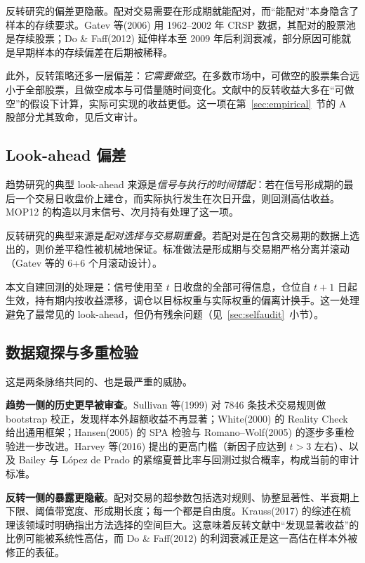反转研究的偏差更隐蔽。配对交易需要在形成期就能配对，而“能配对”本身隐含了样本的存续要求。Gatev 等(2006) 用 1962--2002 年 CRSP 数据，其配对的股票池是存续股票\cite{gatev2006}；Do \& Faff(2012) 延伸样本至 2009 年后利润衰减，部分原因可能就是早期样本的存续偏差在后期被稀释\cite{dofaff2012}。

此外，反转策略还多一层偏差：\emph{它需要做空}。在多数市场中，可做空的股票集合远小于全部股票，且做空成本与可借量随时间变化。文献中的反转收益大多在“可做空”的假设下计算，实际可实现的收益更低。这一项在第~\ref{sec:empirical}~节的 A 股部分尤其致命，见后文审计。

\subsection{Look-ahead 偏差}

趋势研究的典型 look-ahead 来源是\emph{信号与执行的时间错配}：若在信号形成期的最后一个交易日收盘价上建仓，而实际执行发生在次日开盘，则回测高估收益。MOP12 的构造以月末信号、次月持有处理了这一项\cite{mop2012}。

反转研究的典型来源是\emph{配对选择与交易期重叠}。若配对是在包含交易期的数据上选出的，则价差平稳性被机械地保证。标准做法是形成期与交易期严格分离并滚动（Gatev 等的 6+6 个月滚动设计\cite{gatev2006}）。

本文自建回测的处理是：信号使用至 $t$ 日收盘的全部可得信息，仓位自 $t+1$ 日起生效，持有期内按收益漂移，调仓以目标权重与实际权重的偏离计换手。这一处理避免了最常见的 look-ahead，但仍有残余问题（见~\ref{sec:selfaudit}~小节）。

\subsection{数据窥探与多重检验}

这是两条脉络共同的、也是最严重的威胁。

\textbf{趋势一侧的历史更早被审查}。Sullivan 等(1999) 对 7846 条技术交易规则做 bootstrap 校正，发现样本外超额收益不再显著\cite{sullivan1999}；White(2000) 的 Reality Check 给出通用框架\cite{white2000}；Hansen(2005) 的 SPA 检验与 Romano--Wolf(2005) 的逐步多重检验进一步改进\cite{hansen2005,romanowolf2005}。Harvey 等(2016) 提出的更高门槛（新因子应达到 $t>3$ 左右）\cite{hlz2016}、以及 Bailey 与 López de Prado 的紧缩夏普比率与回测过拟合概率\cite{bailey2014,bailey2016}，构成当前的审计标准。

\textbf{反转一侧的暴露更隐蔽}。配对交易的超参数包括选对规则、协整显著性、半衰期上下限、阈值带宽度、形成期长度；每一个都是自由度。Krauss(2017) 的综述在梳理该领域时明确指出方法选择的空间巨大\cite{krauss2017}。这意味着反转文献中“发现显著收益”的比例可能被系统性高估，而 Do \& Faff(2012) 的利润衰减正是这一高估在样本外被修正的表征\cite{dofaff2012}。

